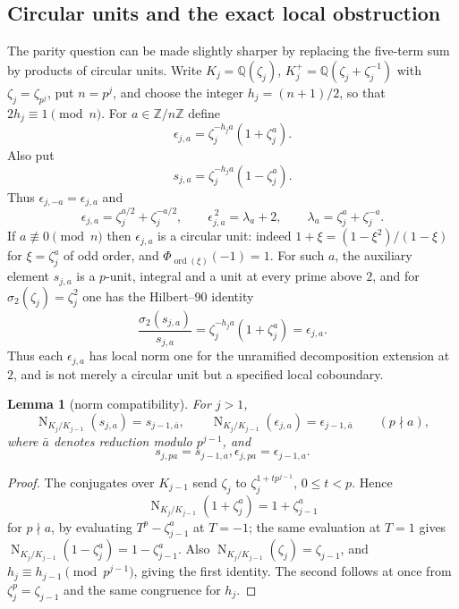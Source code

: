 \documentclass[a4paper]{article}
\newtheorem{lemma}[theorem]{Lemma}
\newcommand{\Z}{\mathbb{Z}}
\newcommand{\Q}{\mathbb{Q}}
\DeclareMathOperator{\Nm}{N}
\begin{document}
\subsection{Circular units and the exact local obstruction}

The parity question can be made slightly sharper by replacing the
five-term sum by products of circular units.  Write
$K_j=\Q(\zeta_j)$, $K_j^+=\Q(\zeta_j+\zeta_j^{-1})$ with
$\zeta_j=\zeta_{p^j}$, put $n=p^j$, and choose the integer
$h_j=(n+1)/2$, so that $2h_j\equiv1\pmod n$.  For
$a\in\Z/n\Z$ define
\[
	\epsilon_{j,a}=\zeta_j^{-h_ja}(1+\zeta_j^a).
\]
Also put
\[
	s_{j,a}=\zeta_j^{-h_ja}(1-\zeta_j^a).
\]
Thus $\epsilon_{j,-a}=\epsilon_{j,a}$ and
\[
	\epsilon_{j,a}=\zeta_j^{a/2}+\zeta_j^{-a/2},
	\qquad
	\epsilon_{j,a}^{\,2}=\lambda_a+2,
	\qquad
	\lambda_a=\zeta_j^a+\zeta_j^{-a}.
\]
If $a\not\equiv0\pmod n$ then $\epsilon_{j,a}$ is a circular unit: indeed
$1+\xi=(1-\xi^2)/(1-\xi)$ for $\xi=\zeta_j^a$ of odd order, and
$\Phi_{\operatorname{ord}(\xi)}(-1)=1$.
For such $a$, the auxiliary element $s_{j,a}$ is a $p$-unit, integral and a unit at
every prime above $2$, and for $\sigma_2(\zeta_j)=\zeta_j^2$ one has the
Hilbert--90 identity
\begin{equation}\label{eq:epsilon-h90}
	\frac{\sigma_2(s_{j,a})}{s_{j,a}}
	=
	\zeta_j^{-h_ja}(1+\zeta_j^a)
	=\epsilon_{j,a}.
\end{equation}
Thus each $\epsilon_{j,a}$ has local norm one for the unramified
decomposition extension at $2$, and is not merely a circular unit but a
specified local coboundary.

\begin{lemma}[norm compatibility]\label{lem:epsilon-norms}
	For $j>1$,
	\[
		\Nm_{K_j/K_{j-1}}(s_{j,a})=s_{j-1,\bar a},
		\qquad
		\Nm_{K_j/K_{j-1}}(\epsilon_{j,a})=\epsilon_{j-1,\bar a}
		\qquad (p\nmid a),
	\]
	where $\bar a$ denotes reduction modulo $p^{j-1}$, and
	\[
		s_{j,pa}=s_{j-1,a},
		\epsilon_{j,pa}=\epsilon_{j-1,a}.
	\]
\end{lemma}

\begin{proof}
	The conjugates over $K_{j-1}$ send
	$\zeta_j$ to $\zeta_j^{1+tp^{j-1}}$, $0\leq t<p$.  Hence
	\[
		\Nm_{K_j/K_{j-1}}(1+\zeta_j^a)=1+\zeta_{j-1}^a
	\]
	for $p\nmid a$, by evaluating $T^p-\zeta_{j-1}^a$ at $T=-1$; the
	same evaluation at $T=1$ gives
	$\Nm_{K_j/K_{j-1}}(1-\zeta_j^a)=1-\zeta_{j-1}^a$.
	Also $\Nm_{K_j/K_{j-1}}(\zeta_j)=\zeta_{j-1}$, and
	$h_j\equiv h_{j-1}\pmod {p^{j-1}}$, giving the first identity.
	The second follows at once from $\zeta_j^p=\zeta_{j-1}$ and the same
	congruence for $h_j$.
\end{proof}
\end{document}
